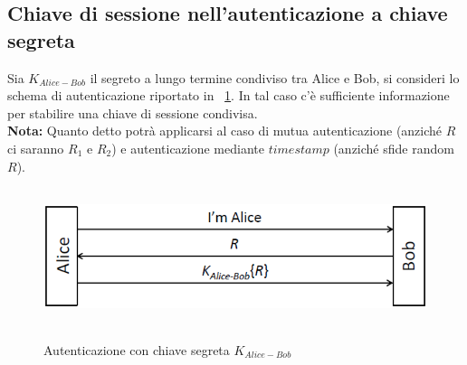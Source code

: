 \subsection{Chiave di sessione nell'autenticazione a chiave segreta}
Sia $K_{Alice-Bob}$ il segreto a lungo termine condiviso tra Alice e Bob, si consideri lo schema di autenticazione riportato in \figurename~\ref{fig:ImgS61bis}. In tal caso c'è sufficiente informazione per stabilire una chiave di sessione condivisa. \\
\textbf{Nota:} Quanto detto potrà applicarsi al caso di mutua autenticazione (anziché $R$ ci saranno $R_{1}$ e $R_{2}$) e autenticazione mediante $timestamp$ (anziché sfide random $R$).  \\
\begin{figure}[htbp]
	\centering%
	\subfigure%
	{\includegraphics[height=4cm, width=12cm, keepaspectratio]{Immagini/autenticazione/ImgS61bis.png}}
	\caption{Autenticazione con chiave segreta $K_{Alice-Bob}$}\label{fig:ImgS61bis} 	
\end{figure}

